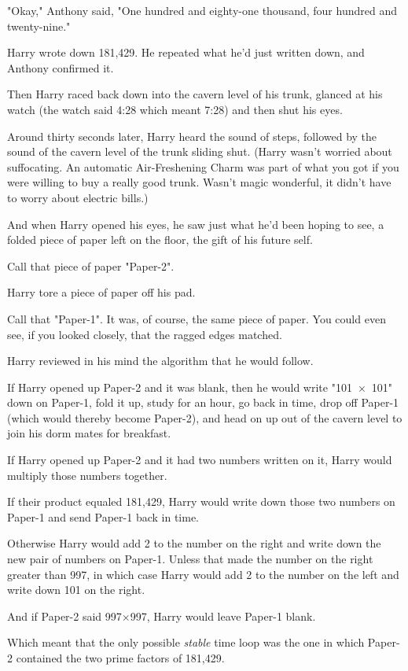 "Okay," Anthony said, "One hundred and eighty-one thousand, four hundred and
twenty-nine."

Harry wrote down 181,429. He repeated what he’d just written down, and Anthony
confirmed it.

Then Harry raced back down into the cavern level of his trunk, glanced at his
watch (the watch said 4:28 which meant 7:28) and then shut his eyes.

Around thirty seconds later, Harry heard the sound of steps, followed by the
sound of the cavern level of the trunk sliding shut. (Harry wasn’t worried
about suffocating. An automatic Air-Freshening Charm was part of what you got
if you were willing to buy a really good trunk. Wasn’t magic wonderful, it
didn’t have to worry about electric bills.)

And when Harry opened his eyes, he saw just what he’d been hoping to see, a
folded piece of paper left on the floor, the gift of his future self.

Call that piece of paper "Paper-2".

Harry tore a piece of paper off his pad.

Call that "Paper-1". It was, of course, the same piece of paper. You could even
see, if you looked closely, that the ragged edges matched.

Harry reviewed in his mind the algorithm that he would follow.

If Harry opened up Paper-2 and it was blank, then he would write "101~$\times$~101"
down on Paper-1, fold it up, study for an hour, go back in time, drop off
Paper-1 (which would thereby become Paper-2), and head on up out of the cavern
level to join his dorm mates for breakfast.

If Harry opened up Paper-2 and it had two numbers written on it, Harry would
multiply those numbers together.

If their product equaled 181,429, Harry would write down those two numbers on
Paper-1 and send Paper-1 back in time.

Otherwise Harry would add 2 to the number on the right and write down the new
pair of numbers on Paper-1. Unless that made the number on the right greater
than 997, in which case Harry would add 2 to the number on the left and write
down 101 on the right.

And if Paper-2 said 997$\times$997, Harry would leave Paper-1 blank.

Which meant that the only possible \emph{stable} time loop was the one in which
Paper-2 contained the two prime factors of 181,429.

